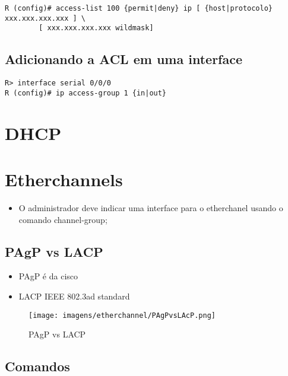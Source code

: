 \documentclass[]{article}
\begin{document}
\begin{verbatim}
R (config)# access-list 100 {permit|deny} ip [ {host|protocolo} xxx.xxx.xxx.xxx ] \
        [ xxx.xxx.xxx.xxx wildmask]
\end{verbatim}

\subsection{Adicionando a ACL em uma
interface}\label{adicionando-a-acl-em-uma-interface}

\begin{verbatim}
R> interface serial 0/0/0
R (config)# ip access-group 1 {in|out}
\end{verbatim}

\section{DHCP}\label{dhcp}

\section{Etherchannels}\label{etherchannels}

\begin{itemize}
\itemsep1pt\parskip0pt
\item
  O administrador deve indicar uma interface para o etherchanel usando o
  comando channel-group;
\end{itemize}

\subsection{PAgP vs LACP}\label{pagp-vs-lacp}

\begin{itemize}
\item
  PAgP é da cisco
\item
  LACP IEEE 802.3ad standard
\end{itemize}

\begin{figure}[htbp]
\centering
\texttt{[image: imagens/etherchannel/PAgPvsLAcP.png]}
\caption{PAgP vs LACP}
\end{figure}

\subsection{Comandos}\label{comandos}
\end{document}
